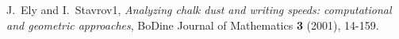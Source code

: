 \documentclass[12pt, numbers=noenddot]{scrreprt} %
\begin{document}
\newpage

\begin{thebibliography}{99}

J.~Ely and I.~Stavrov1,
\emph{Analyzing chalk dust and writing speeds: computational and geometric approaches},
BoDine Journal of Mathematics \textbf{3} (2001), 14-159.

\end{thebibliography}


\listoffigures%
\listoftables%
\end{document}
